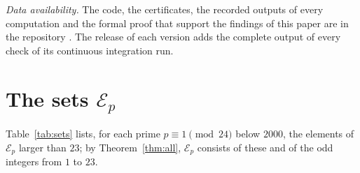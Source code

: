 \documentclass[12pt]{amsart}
\theoremstyle{definition}
\newcommand{\cE}{\mathcal{E}}
\begin{document}
\emph{Data availability.} The code, the certificates, the recorded outputs of every computation and the formal proof that support the findings of this paper are in the repository \cite{Rep}. The release of each version adds the complete output of every check of its continuous integration run.

\appendix
\section{\texorpdfstring{The sets $\cE_p$}{The sets E\_p}}\label{app:sets}

Table~\ref{tab:sets} lists, for each prime $p\equiv1\pmod{24}$ below $2000$, the elements of $\cE_p$ larger than $23$; by Theorem~\ref{thm:all}, $\cE_p$ consists of these and of the odd integers from $1$ to $23$.
\end{document}
